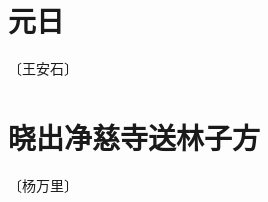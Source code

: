 \documentclass[12pt,UTF-8,openany]{ctexbook}
\begin{document}
\vspace{8pt}


\section{元日}

\begin{center}
    \vspace{10pt}
    
    \begin{normalsize}
        
        〔王安石〕
        
    \end{normalsize}
    
    \vspace{8pt}
    
    \begin{large}
        
        
        
    \end{large}
    
\end{center}

\vspace{8pt}


\section{晓出净慈寺送林子方}

\begin{center}
    \vspace{10pt}
    
    \begin{normalsize}
        
        〔杨万里〕
        
    \end{normalsize}
    
    \vspace{8pt}
    
    \begin{large}
        
        
        
    \end{large}
    
\end{center}
\end{document}

